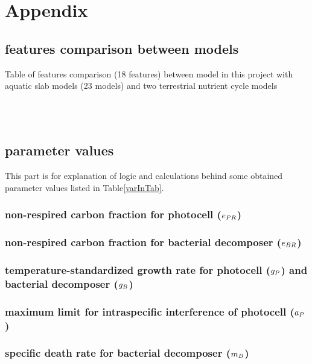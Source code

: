 \documentclass[../thesis.tex]{subfiles} %
\begin{document}
\section{Appendix}
\beginSupp

\subsection{features comparison between models}
\begin{table}[H]
\begin{tiny}
    \centering
    \caption[Model features comparison]{Table of features comparison (18 features) between model in this project with aquatic slab models (23 models) and two terrestrial nutrient cycle models}
    \\
    \vspace{.5cm}
    \\
    \vspace{.5cm}
    \label{modComp}
\end{tiny}
\end{table}

\subsection{parameter values}
This part is for explanation of logic and calculations behind some obtained parameter values listed in Table\ref{varInTab}.

\subsubsection{non-respired carbon fraction for photocell ($e_{PR}$)}


\subsubsection{non-respired carbon fraction for bacterial decomposer ($e_{BR}$)}

\subsubsection{temperature-standardized growth rate for photocell ($g_P$) and bacterial decomposer ($g_B$)}

\subsubsection{maximum limit for intraspecific interference of photocell ($a_P$)}

\subsubsection{specific death rate for bacterial decomposer ($m_B$)}
\end{document}
